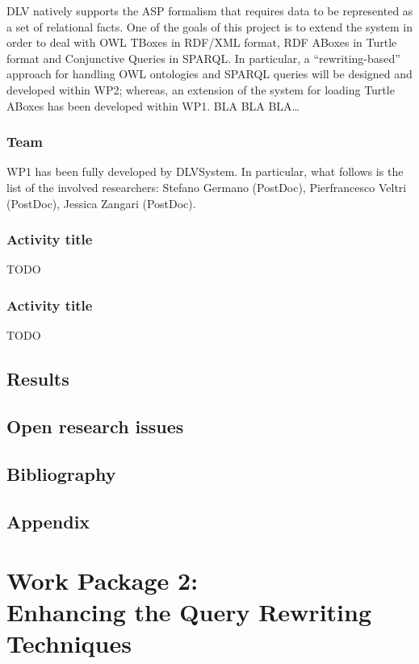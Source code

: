 \documentclass[oneside]{book}
\begin{document}
DLV natively supports the ASP formalism that requires data to be represented as a set of relational facts. One of the goals of this project is to extend the system in order to deal with OWL TBoxes in RDF/XML format, RDF ABoxes in Turtle format and Conjunctive Queries in SPARQL. In particular, a “rewriting-based” approach for handling OWL ontologies and SPARQL queries will be designed and developed within WP2; whereas, an extension of the system for loading Turtle ABoxes has been developed within WP1. 
BLA BLA BLA…

\section{Team}
WP1 has been fully developed by DLVSystem. In particular, what follows is the list of the involved researchers: Stefano Germano (PostDoc), Pierfrancesco Veltri (PostDoc), Jessica Zangari (PostDoc).

\section{Activity title}
TODO
\section{Activity title}
TODO
\chapter{Results}
\chapter{Open research issues}
\chapter{Bibliography}
\chapter{Appendix}



\setcounter{chapter}{0}

\part*{Work Package 2:\\Enhancing the Query Rewriting Techniques}
\end{document}
